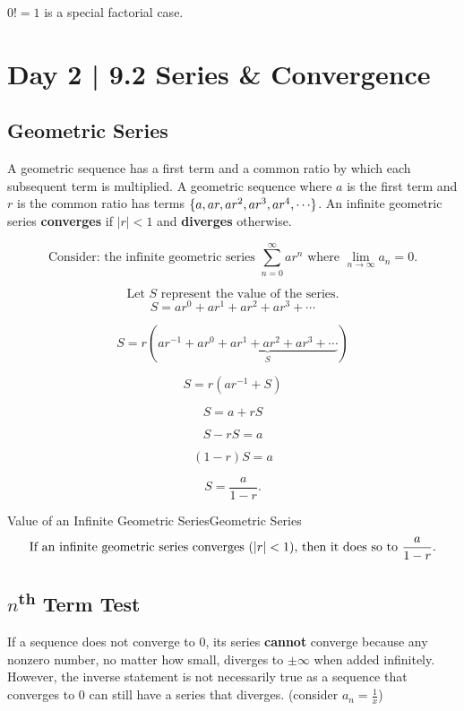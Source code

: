 \documentclass[10pt]{article}
\theoremstyle{definition}
\DeclarePairedDelimiter{\abs}{\lvert}{\rvert}
\DeclarePairedDelimiter{\curly}{\{}{\}}
\begin{document}
\begin{center}
    $0!=1$ is a special factorial case.
\end{center}



\section{Day 2 | 9.2 Series \& Convergence}

\subsection{Geometric Series}
A geometric sequence has a first term and a common ratio by which each subsequent term is multiplied. A geometric sequence where $a$ is the first term and $r$ is the common ratio has terms $\curly{a, ar, ar^2, ar^3, ar^4, \cdots}$.
An infinite geometric series \textbf{converges} if $\lvert r \rvert <1$ and \textbf{diverges} otherwise.


\[\text{Consider: the infinite geometric series } \sum_{n=0}^{\infty} ar^n \text{ where } \lim_{n \to \infty} a_n=0.\]

\[\text{Let $S$ represent the value of the series.}\]
\[S=ar^0+ar^1+ar^2+ar^3+\cdots\]

\[S=r(ar^{-1}+\underbrace{ar^0+ar^1+ar^2+ar^3+\cdots}_ {S})\] 

\[S=r(ar^{-1}+S)\]

\[S=a+rS\]

\[S-rS=a\]

\[(1-r)S=a\]

\[S=\frac{a}{1-r}.\]

\begin{theorem}{Value of an Infinite Geometric Series}{Geometric Series}
\vspace{-0.3cm}
    \[\text{If an infinite geometric series converges ($\abs{r}<1$), then it does so to } \frac{a}{1-r}.\]
\end{theorem}

\subsection{$n$\textsuperscript{th} Term Test}
If a sequence does not converge to 0, its series \textbf{cannot} converge because any nonzero number, no matter how small, diverges to $\pm \infty$ when added infinitely. However, the inverse statement is not necessarily true as a sequence that converges to 0 can still have a series that diverges. (consider $a_n=\frac{1}{x}$)
\end{document}
